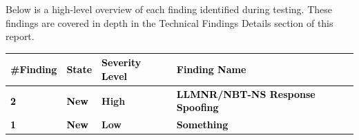 Below is a high-level overview of each finding identified during testing. These findings are covered in depth in the
Technical Findings Details section of this report. 

\begin{table}[h!]
    \centering
    \begin{tabularx}{\textwidth}{|X|X|X|X|}
        \hline
        \rowcolor{TableHeaderBgRowColor}        
        \textcolor{black}{\textbf{\#Finding}} &
        \textcolor{black}{\textbf{State}} &
        \textcolor{black}{\textbf{Severity Level}} &
        \textcolor{black}{\textbf{Finding Name}} \\
        \hline
        \rowcolor{TableBgRowColor}        
        \textcolor{black}{\textbf{2}} &
        \textcolor{black}{\textbf{New}} &
        \textcolor{HighVulnColor}{\textbf{High}} &
        \textcolor{black}{\textbf{LLMNR/NBT-NS Response Spoofing}} \\
        \hline
        \rowcolor{TableBgRowIntemediaColor}        
        \textcolor{black}{\textbf{1}} &
        \textcolor{black}{\textbf{New}} &
        \textcolor{LowVulnColor}{\textbf{Low}} &
        \textcolor{black}{\textbf{Something}} \\
        \hline
    \end{tabularx}
    \label{tabla:ancho-completo}
\end{table}